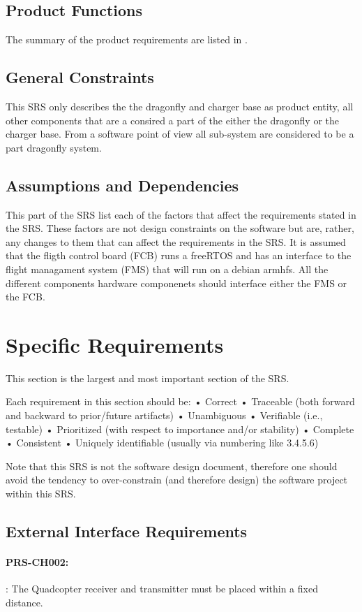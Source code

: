 \documentclass[a4paper]{article}
\newcommand{\requirement}[2]{
  \paragraph*{#2:}
  \label{#1}
  \addcontentsline{toc}{paragraph}{\nameref{#1}}
}
\begin{document}
\subsection{Product Functions}

The summary of the product requirements are listed in \cite{Dragonfly-PRS}. 


\subsection{General Constraints}

This SRS only describes the the dragonfly and charger base as product entity, all other components that are a consired a part of the either the dragonfly or the charger base.
From a software point of view all sub-system are considered to be a part  dragonfly system.

\subsection{Assumptions and Dependencies}

This part of the SRS list each of the factors that affect the requirements stated in the SRS. These factors are not design constraints on the software but are, rather, any changes to them that can affect the requirements in the SRS. 
It is assumed that the fligth control board (FCB) runs a freeRTOS and has an interface to the flight managament system (FMS) that will run on a debian armhfs. All the different components hardware componenets should interface either the FMS or the FCB.

\section{Specific Requirements}

This section is the largest and most important section of the SRS.

Each requirement in this section should be:
•	Correct
•	Traceable (both forward and backward to prior/future artifacts)
•	Unambiguous
•	Verifiable (i.e., testable)
•	Prioritized (with respect to importance and/or stability)
•	Complete
•	Consistent
•	Uniquely identifiable (usually via numbering like 3.4.5.6)

Note that this SRS is not the software design document, therefore one should avoid the tendency to over-constrain (and therefore design) the software project within this SRS.

\subsection{External Interface Requirements}
\requirement{req:PRS-CH002}{PRS-CH002}: The Quadcopter receiver and transmitter must be placed within a fixed distance.
\end{document}
